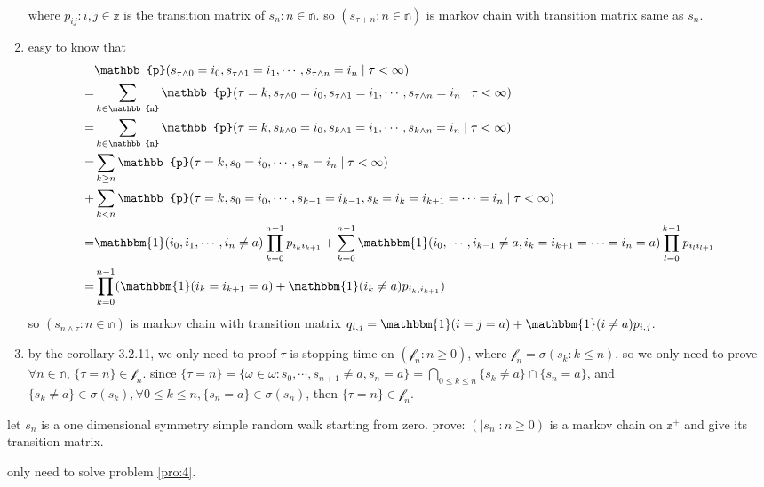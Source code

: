 \documentclass{ctexart}
\begin{document}
\begin{solution}
\begin{enumerate}
\[\begin{aligned}
        \end{aligned}
      \]
      where \(p_{ij}:i,j \in \mathbb{z}\) is the transition matrix of \(s_n:n \in \mathbb{n}\).
      so \((s_{\tau+n}:n \in \mathbb{n})\) is markov chain with transition matrix same as \(s_n\).
    \item easy to know that
      \[
        \begin{aligned}
           & \mathbb{p}(s_{\tau \wedge 0}=i_0,s_{\tau\wedge 1}=i_1,\cdots,s_{\tau\wedge n}=i_n \mid \tau<\infty)
          \\= & \sum_{k \in \mathbb{n}}\mathbb{p}(\tau=k,s_{\tau \wedge 0}=i_0,s_{\tau\wedge 1}=i_1,\cdots,s_{\tau\wedge n}=i_n \mid \tau<\infty)
          \\= & \sum_{k \in \mathbb{n}}\mathbb{p}(\tau=k,s_{k \wedge 0}=i_0,s_{k\wedge 1}=i_1,\cdots,s_{k\wedge n}=i_n \mid \tau<\infty)
          \\= & \sum_{k \geq n} \mathbb{p}(\tau =k,s_0=i_0,\cdots,s_n=i_n \mid \tau<\infty)
          \\+ & \sum_{k < n} \mathbb{p}(\tau =k,s_0=i_0,\cdots,s_{k-1}=i_{k-1},s_k=i_k=i_{k+1} =\cdots=i_n \mid \tau<\infty)
          \\= & \mathbbm{1}(i_0,i_1,\cdots,i_n \neq a) \prod_{k=0}^{n-1} p_{i_k i_{k+1}} + \sum_{k=0}^{n-1} \mathbbm{1}(i_0,\cdots,i_{k-1} \neq a,i_k=i_{k+1}=\cdots=i_n=a) \prod_{l=0}^{k-1} p_{i_l i_{l+1}}
          \\=&\prod_{k=0}^{n-1} (\mathbbm{1}(i_k=i_{k+1}=a)+\mathbbm{1}(i_k \neq a)p_{i_k,i_{k+1}})
        \end{aligned}
      \]
      so \((s_{n \wedge \tau}:n \in \mathbb{n})\) is markov chain with transition matrix \(q_{i,j}=\mathbbm{1}(i=j=a)+\mathbbm{1}(i \neq a)p_{i,j}\).
    \item by the corollary 3.2.11, we only need to proof \(\tau\) is stopping time on \((\mathscr{f}_n:n \geq 0)\),
      where \(\mathscr{f}_n=\sigma(s_k:k \leq n)\).
      so we only need to prove \(\forall n \in \mathbb{n}\), \(\{\tau = n\} \in \mathscr{f}_n\).
      since \(\{\tau =n\}=\{\omega \in \omega: s_0,\cdots,s_{n + 1} \neq a, s_n = a\}=\bigcap_{0 \leq k \leq n}\{s_k \neq a\}\cap\{s_n=a\}\),
      and \(\{s_k \neq a\} \in \sigma(s_k), \forall 0 \leq k \leq n,\{s_n = a\} \in \sigma(s_n)\),
      then \(\{\tau = n\} \in \mathscr{f}_n\).
  \end{enumerate}
\end{solution}

\begin{problem}\label{pro:3}
  let \(s_n\) is a one dimensional symmetry simple random walk starting from zero.
  prove: \((|s_n|: n \geq 0)\) is a markov chain on \(\mathbb{z}^+\) and give its transition matrix.
\end{problem}
\begin{solution}
  only need to solve problem \ref{pro:4}.
\end{solution}
\end{document}
